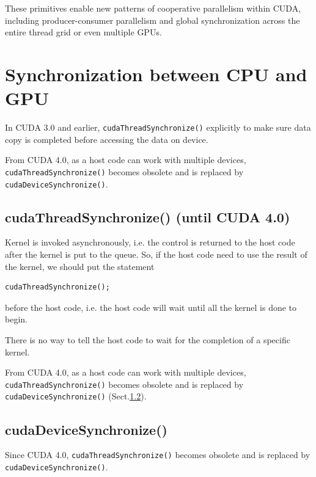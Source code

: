 These primitives enable new patterns of cooperative parallelism within CUDA,
including producer-consumer parallelism and global synchronization across the
entire thread grid or even multiple GPUs.




\section{Synchronization between CPU and GPU}
\label{sec:synchronize-CPU-GPU}

In CUDA 3.0 and earlier, \verb!cudaThreadSynchronize()!  explicitly to make sure
data copy is completed before accessing the data on device.

From CUDA 4.0, as a host code can work with multiple devices,
\verb!cudaThreadSynchronize()! becomes obsolete and is replaced by
\verb!cudaDeviceSynchronize()!.

\subsection{cudaThreadSynchronize() (until CUDA 4.0)}
\label{sec:cudaThreadSynchronize()}


Kernel is invoked asynchronously, i.e. the control is returned to the
host code after the kernel is put to the queue. So, if the host code
need to use the result of the kernel, we should put the statement
\begin{lstlisting}
cudaThreadSynchronize();
\end{lstlisting}
before the host code, i.e. the host code will wait until all the
kernel is done to begin. 

\begin{framed}
  There is no way to tell the host code to wait for the completion of
  a specific kernel.
\end{framed}

From CUDA 4.0, as a host code can work with multiple devices,
\verb!cudaThreadSynchronize()! becomes obsolete and is replaced by
\verb!cudaDeviceSynchronize()! (Sect.\ref{sec:cudaDeviceSynchronize()-CUDA4.0}).

\subsection{cudaDeviceSynchronize()}
\label{sec:cudaDeviceSynchronize()-CUDA4.0}

Since CUDA 4.0, \verb!cudaThreadSynchronize()! becomes obsolete and is replaced by
\verb!cudaDeviceSynchronize()!.


